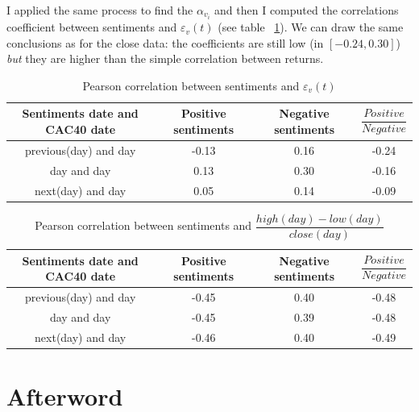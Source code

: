 \documentclass[12pt]{report}
\begin{document}
			I applied the same process to find the $\alpha_{v_i}$ and then I computed the correlations coefficient between sentiments and $\varepsilon_v(t)$ (see table ~\ref{pearson_cac_vol_ar}). We can draw the same conclusions as for the close data: the coefficients are still low (in $[-0.24, 0.30]$) \emph{but} they are higher than the simple correlation between returns.

			\begin{table}
			\begin{tabular}{|c || c | c | c|}
				\hline
				Sentiments date and CAC40 date & Positive sentiments & Negative sentiments & $\dfrac{Positive}{Negative}$\\
				\hline
				previous(day) and day & -0.13 & 0.16 & -0.24\\
				\hline
				day and day & 0.13 & 0.30 & -0.16\\
				\hline
				next(day) and day & 0.05 & 0.14 & -0.09\\
				\hline
			\end{tabular}

			\caption{Pearson correlation between sentiments and $\varepsilon_v(t)$\label{pearson_cac_vol_ar}}
			\end{table}

			\begin{table}
			\begin{tabular}{|c || c | c | c|}
				\hline
				Sentiments date and CAC40 date & Positive sentiments & Negative sentiments & $\dfrac{Positive}{Negative}$\\
				\hline
				previous(day) and day & -0.45 & 0.40 & -0.48\\
				\hline
				day and day & -0.45 & 0.39 & -0.48\\
				\hline
				next(day) and day & -0.46 & 0.40 & -0.49\\
				\hline
			\end{tabular}

			\caption{Pearson correlation between sentiments and $\dfrac{high(day) - low(day)}{close(day)}$\label{pearson_highlow}}
			\end{table}

	\chapter{Afterword}

	
	
\end{document}
